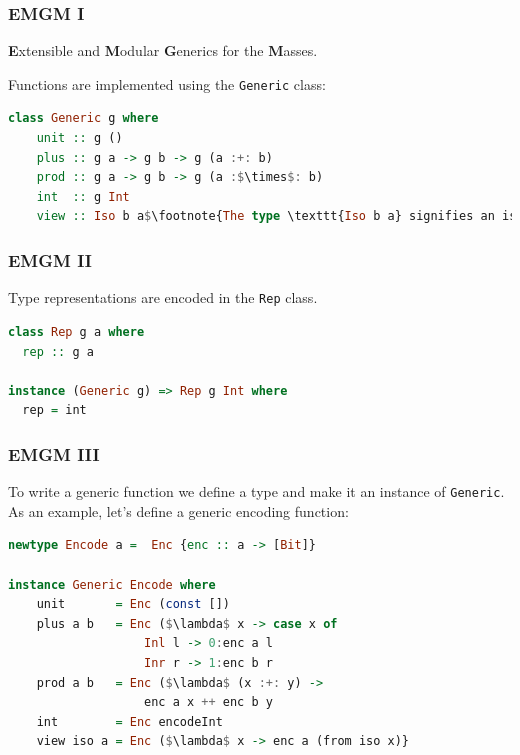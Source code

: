 \documentclass[10pt]{beamer}
\begin{document}
\begin{frame}[fragile]
\frametitle{EMGM I}
\textbf{E}xtensible and \textbf{M}odular \textbf{G}enerics for the \textbf{M}asses.
\vspace{30pt}

Functions are implemented using the \texttt{Generic} class:\\

\begin{center}
\begin{lstlisting}[language=Haskell,basicstyle=\ttfamily\scriptsize,mathescape]
class Generic g where
    unit :: g ()
    plus :: g a -> g b -> g (a :+: b)
    prod :: g a -> g b -> g (a :$\times$: b)
    int  :: g Int
    view :: Iso b a$\footnote{The type \texttt{Iso b a} signifies an isomorphism between the types \texttt{a} and \texttt{b}.}$ -> g a -> g b
\end{lstlisting}
\end{center}
\end{frame}

\begin{frame}[fragile]
\frametitle{EMGM II}
 Type representations are encoded in the \texttt{Rep} class.

\vspace{30pt}



\begin{lstlisting}[language=Haskell,basicstyle=\ttfamily\scriptsize,mathescape]
class Rep g a where
  rep :: g a

instance (Generic g) => Rep g Int where
  rep = int
\end{lstlisting}



\end{frame}


\begin{frame}[fragile]
\frametitle{EMGM III}
To write a generic function we define a type and make it an instance of \texttt{Generic}. As an example, let's define a generic encoding function:
\begin{lstlisting}[language=Haskell,basicstyle=\ttfamily\scriptsize,mathescape]
newtype Encode a =  Enc {enc :: a -> [Bit]}

instance Generic Encode where
    unit       = Enc (const [])
    plus a b   = Enc ($\lambda$ x -> case x of
                   Inl l -> 0:enc a l
                   Inr r -> 1:enc b r
    prod a b   = Enc ($\lambda$ (x :+: y) ->
                   enc a x ++ enc b y
    int        = Enc encodeInt
    view iso a = Enc ($\lambda$ x -> enc a (from iso x)}
\end{lstlisting}

\end{frame}
\end{document}
